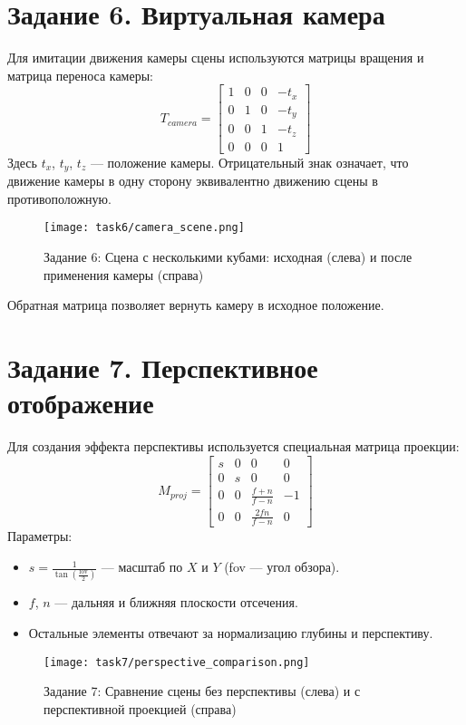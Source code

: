 \section{Задание 6. Виртуальная камера}

Для имитации движения камеры сцены используются матрицы вращения и матрица переноса камеры:
\[
T_{camera} = \begin{bmatrix}
1 & 0 & 0 & -t_x \\
0 & 1 & 0 & -t_y \\
0 & 0 & 1 & -t_z \\
0 & 0 & 0 & 1
\end{bmatrix}
\]
Здесь $t_x$, $t_y$, $t_z$ --- положение камеры. Отрицательный знак означает, что движение камеры в одну сторону эквивалентно движению сцены в противоположную.

\begin{figure}[h!]
    \centering
    \texttt{[image: task6/camera\_scene.png]}
    \caption{Задание 6: Сцена с несколькими кубами: исходная (слева) и после применения камеры (справа)}
\end{figure}

Обратная матрица позволяет вернуть камеру в исходное положение.

\section{Задание 7. Перспективное отображение}

Для создания эффекта перспективы используется специальная матрица проекции:
\[
M_{proj} = \begin{bmatrix}
s & 0 & 0 & 0 \\
0 & s & 0 & 0 \\
0 & 0 & \frac{f+ n}{f-n} & -1 \\
0 & 0 & \frac{2fn}{f-n} & 0
\end{bmatrix}
\]
Параметры:
\begin{itemize}
    \item $s = \frac{1}{\tan(\frac{\text{fov}}{2})}$ --- масштаб по $X$ и $Y$ (fov --- угол обзора).
    \item $f$, $n$ --- дальняя и ближняя плоскости отсечения.
    \item Остальные элементы отвечают за нормализацию глубины и перспективу.
\end{itemize}

\begin{figure}[h!]
    \centering
    \texttt{[image: task7/perspective\_comparison.png]}
    \caption{Задание 7: Сравнение сцены без перспективы (слева) и с перспективной проекцией (справа)}
\end{figure}

